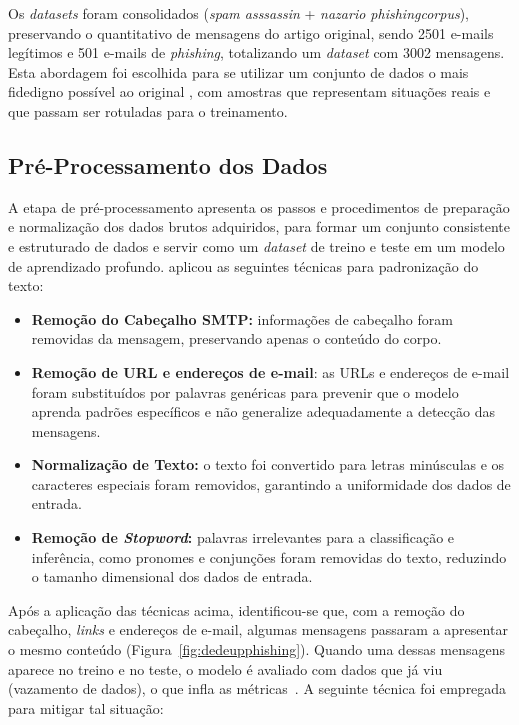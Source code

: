 \documentclass[12pt]{article}
\begin{document}
        Os \textit{datasets} foram consolidados (\textit{spam asssassin} + \textit{nazario phishingcorpus}), preservando o quantitativo de mensagens do artigo original, sendo 2501 e-mails legítimos e 501 e-mails de \textit{phishing}, totalizando um \textit{dataset} com 3002 mensagens. Esta abordagem foi escolhida para se utilizar um conjunto de dados o mais fidedigno possível ao original ,  com amostras que representam situações reais e que passam ser rotuladas para o treinamento.
        
    
\subsection{Pré-Processamento dos Dados}\label{sub:dt_pre}

        A etapa de pré-processamento apresenta os passos e procedimentos de preparação e normalização dos dados brutos adquiridos, para formar um conjunto consistente e estruturado de dados e servir como um \textit{dataset} de treino e teste em um modelo de aprendizado profundo.  \cite{bispo2025philder} aplicou as seguintes técnicas para padronização do texto:
        
        \begin{itemize}
            \item  \textbf{Remoção do Cabeçalho SMTP:} informações de cabeçalho foram removidas da mensagem, preservando apenas o conteúdo do corpo.

            \item \textbf{Remoção de URL e endereços de e-mail}: as URLs e endereços de e-mail foram substituídos por palavras genéricas para prevenir que o modelo aprenda padrões específicos e não generalize adequadamente a detecção das mensagens.

            \item \textbf{Normalização de Texto:} o texto foi convertido para letras minúsculas e os caracteres especiais foram removidos, garantindo a uniformidade dos dados de entrada.

            \item \textbf{Remoção de \textit{Stopword}:} palavras irrelevantes para a classificação e inferência, como pronomes e conjunções foram removidas do texto, reduzindo o tamanho dimensional dos dados de entrada.

         \end{itemize}
         
         Após a aplicação das técnicas acima, identificou-se que, com a remoção do cabeçalho, \textit{links} e endereços de e-mail, algumas mensagens passaram a apresentar o mesmo conteúdo (Figura~\ref{fig:dedeupphishing}). Quando uma dessas mensagens aparece no treino e no teste, o modelo é avaliado com dados que já viu (vazamento de dados), o que infla as métricas~\cite{arp2022dos}. A seguinte técnica foi empregada para mitigar tal situação:
\end{document}
